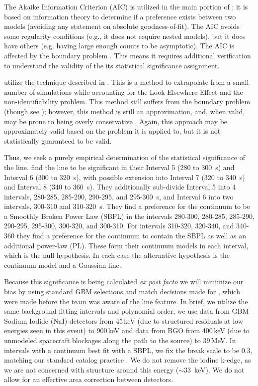 \documentclass{aastex61}
\begin{document}
The Akaike Information Criterion (AIC) \cite{akaike1974new} is utilized in the main portion of \citet{ravasio2024mega}; it is based on information theory to determine if a preference exists between two models (avoiding any statement on absolute goodness-of-fit). The AIC avoids some regularity conditions (e.g., it does not require nested models), but it does have others (e.g. having large enough counts to be asymptotic). The AIC is affected by the boundary problem \citep{mitchell2022generalized}. This means it requires additional verification to understand the validity of the its statistical significance assignment. 

\citet{ravasio2024mega} utilize the technique described in \citet{gross2010trial}. This is a method to extrapolate from a small number of simulations while accounting for the Look Elsewhere Effect and the non-identifiability problem. This method still suffers from the boundary problem (though see \citet{chernoff1954distribution}); however, this method is still an approximation, and, when valid, may be prone to being overly conservative \citep{algeri2019searching}. Again, this approach may be approximately valid based on the problem it is applied to, but it is not statistically guaranteed to be valid.

Thus, we seek a purely empirical determination of the statistical significance of the line. \citet{ravasio2024mega} find the line to be significant in their Interval 5 (280 to 300~s) and Interval 6 (300 to 320~s), with possible extension into Interval 7 (320 to 340~s) and Interval 8 (340 to 360~s). They additionally sub-divide Interval 5 into 4 intervals, 280-285, 285-290, 290-295, and 295-300~s, and Interval 6 into two intervals, 300-310 and 310-320~s. They find a preference for the continuum to be a Smoothly Broken Power Law (SBPL) \citep{gruber2014fermi} in the intervals 280-300, 280-285, 285-290, 290-295, 295-300, 300-320, and 300-310. For intervals 310-320, 320-340, and 340-360 they find a preference for the continuum to contain the SBPL as well as an additional power-law (PL). These form their continuum models in each interval, which is the null hypothesis. In each case the alternative hypothesis is the continuum model and a Gaussian line. 

Because this significance is being calculated \textit{ex post facto} we will minimize our bias by using standard GBM selections and match decisions made for \citet{lesage2023fermi}, which were made before the team was aware of the line feature. In brief, we utilize the same background fitting intervals and polynomial order, we use data from GBM Sodium Iodide (NaI) detectors from 45\,keV (due to structured residuals at low energies seen in this event) to 900\,keV and data from BGO from 400\,keV (due to unmodeled spacecraft blockages along the path to the source) to 39\,MeV. In intervals with a continuum best fit with a SBPL, we fix the break scale to be 0.3, matching our standard catalog practice \citep{kaneko2006complete,gruber2014fermi,Poolakkil+21GBMspeccat}. We do not remove the iodine k-edge, as we are not concerned with structure around this energy ($\sim$33~keV). We do not allow for an effective area correction between detectors.
\end{document}
